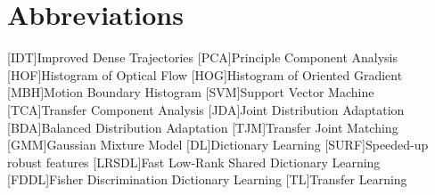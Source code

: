 \chapter*{Abbreviations}
\setcounter{page}{10}

\begin{acronym}
	[IDT]{Improved Dense Trajectories}
	[PCA]{Principle Component Analysis}
	[HOF]{Histogram of Optical Flow}
	[HOG]{Histogram of Oriented Gradient}
	[MBH]{Motion Boundary Histogram}
	[SVM]{Support Vector Machine}
	[TCA]{Transfer Component Analysis}
	[JDA]{Joint Distribution Adaptation}
	[BDA]{Balanced Distribution Adaptation}
	[TJM]{Transfer Joint Matching}
	[GMM]{Gaussian Mixture Model}
	[DL]{Dictionary Learning}
	[SURF]{Speeded-up robust features} 
	[LRSDL]{Fast Low-Rank Shared Dictionary Learning}
	[FDDL]{Fisher Discrimination Dictionary Learning}
	[TL]{Transfer Learning}
\end{acronym}
